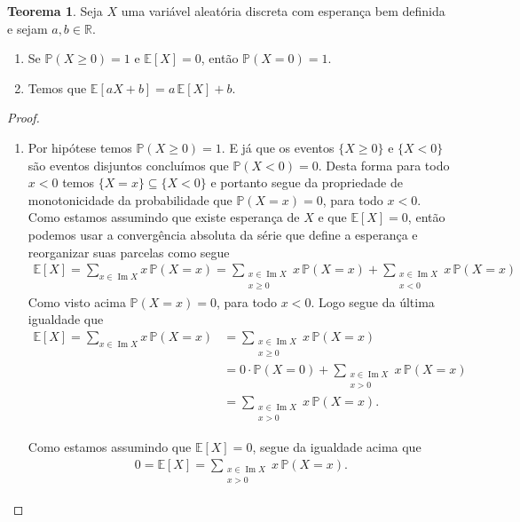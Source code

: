 \documentclass[12pt,portuguese]{article}
\let\geq\geqslant
\theoremstyle{definition}
\newtheorem{theorem}{Teorema}
\begin{document}
\begin{theorem}\label{thm:propriedades-esperanca}
Seja \(X\) uma variável aleatória discreta com esperança bem definida e sejam
\(a, b \in \mathbb{R}\).
\begin{enumerate}[label=(\alph*)]
\item Se \(\mathbb{P}(X \geq 0) = 1\) e \(\mathbb{E}[X] = 0\), então
\(\mathbb{P}(X = 0) = 1\).
\item Temos que \(\mathbb{E}[aX + b] = a\,\mathbb{E}[X] + b\).
\end{enumerate}
\end{theorem}

\begin{proof}
\begin{enumerate}[label=(\alph*)]
\item Por hipótese temos 
\(\mathbb{P}(X \geq 0) = 1\). E já que os eventos $\{X\geqslant 0\}$ e $\{X<0\}$ são eventos
disjuntos concluímos que $\mathbb{P}(X<0)=0$. Desta forma para todo $x<0$
temos $\{X=x\}\subseteq \{X<0\}$ e portanto segue da propriedade de monotonicidade da probabilidade
que $\mathbb{P}(X=x)=0$, para todo $x<0$.
Como estamos assumindo que existe esperança de $X$ e que $\mathbb{E}[X]=0$, então podemos usar a convergência
absoluta da série que define a esperança e reorganizar suas parcelas como segue
\begin{align*}
\mathbb{E}[X] = \sum_{x \in \operatorname{Im} X} x\, \mathbb{P}(X=x) 
= 
\sum_{ \substack{ x \in \operatorname{Im} X \\ x\geqslant 0 }  }  x\, \mathbb{P}(X=x)  +
\sum_{ \substack{ x \in \operatorname{Im} X \\ x< 0 }  }  x\, \mathbb{P}(X=x)  
\end{align*}
Como visto acima $\mathbb{P}(X=x)=0$, para todo $x<0$. Logo segue da última igualdade que
\begin{align*}
\mathbb{E}[X] = \sum_{x \in \operatorname{Im} X} x\, \mathbb{P}(X=x) 
&= 
\sum_{ \substack{ x \in \operatorname{Im} X \\ x\geqslant 0 }  }  x\, \mathbb{P}(X=x)
\\[0.4cm]
&=
0\cdot \mathbb{P}(X=0)+ \sum_{ \substack{ x \in \operatorname{Im} X \\ x> 0 }  }  x\, \mathbb{P}(X=x)
\\[0.4cm]
&=
\sum_{ \substack{ x \in \operatorname{Im} X \\ x> 0 }  }  x\, \mathbb{P}(X=x).
\end{align*}

Como estamos assumindo que $\mathbb{E}[X]=0$, segue da igualdade acima que 
\begin{align*}
0= \mathbb{E}[X] = \sum_{ \substack{ x \in \operatorname{Im} X \\ x> 0 }  }  x\, \mathbb{P}(X=x).
\end{align*}


\end{enumerate}
\end{proof}
\end{document}
